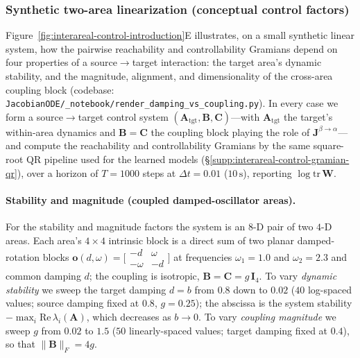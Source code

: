 \subsubsection{Synthetic two-area linearization (conceptual control factors)}\label{supp:interareal-control-toy-twoarea}

Figure~\ref{fig:interareal-control-introduction}E illustrates, on a small synthetic linear system, how the pairwise reachability and controllability Gramians depend on four properties of a source$\to$target interaction: the target area's dynamic stability, and the magnitude, alignment, and dimensionality of the cross-area coupling block (codebase: \texttt{JacobianODE/\_notebook/render\_damping\_vs\_coupling.py}). In every case we form a source$\to$target control system $(\mathbf{A}_{\mathrm{tgt}},\mathbf{B},\mathbf{C})$---with $\mathbf{A}_{\mathrm{tgt}}$ the target's within-area dynamics and $\mathbf{B}=\mathbf{C}$ the coupling block playing the role of $\mathbf{J}^{\beta\to\alpha}$---and compute the reachability and controllability Gramians by the same square-root QR pipeline used for the learned models (\S\ref{supp:interareal-control-gramian-qr}), over a horizon of $T=1000$ steps at $\Delta t=0.01$ ($10\,\mathrm{s}$), reporting $\log\mathrm{tr}\,\mathbf{W}$.

\paragraph{Stability and magnitude (coupled damped-oscillator areas).} For the stability and magnitude factors the system is an $8$-D pair of two $4$-D areas. Each area's $4\times4$ intrinsic block is a direct sum of two planar damped-rotation blocks $\mathbf{o}(d,\omega)=\bigl[\begin{smallmatrix}-d&\omega\\-\omega&-d\end{smallmatrix}\bigr]$ at frequencies $\omega_{1}=1.0$ and $\omega_{2}=2.3$ and common damping $d$; the coupling is isotropic, $\mathbf{B}=\mathbf{C}=g\,\mathbf{I}_{4}$. To vary \emph{dynamic stability} we sweep the target damping $d=b$ from $0.8$ down to $0.02$ ($40$ log-spaced values; source damping fixed at $0.8$, $g=0.25$); the abscissa is the system stability $-\max_i\mathrm{Re}\,\lambda_i(\mathbf{A})$, which decreases as $b\to0$. To vary \emph{coupling magnitude} we sweep $g$ from $0.02$ to $1.5$ ($50$ linearly-spaced values; target damping fixed at $0.4$), so that $\|\mathbf{B}\|_{F}=4g$.

